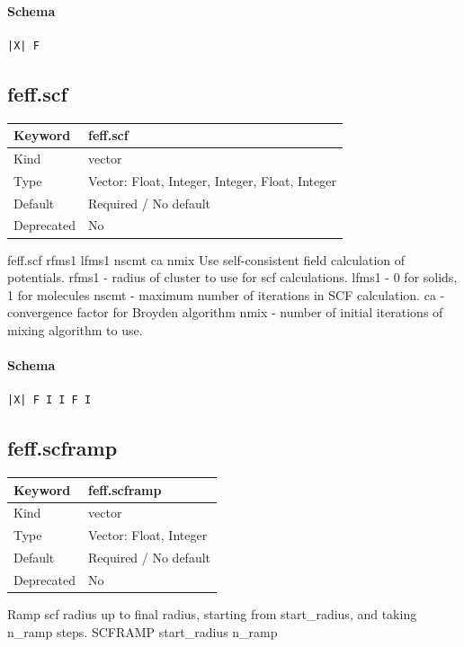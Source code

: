 \documentclass[11pt]{article}
\begin{document}
{{{{\paragraph{Schema}
\begin{Verbatim}
|X| F
\end{Verbatim}

\subsection{feff.scf}
\label{kw:feff-scf}
\begin{longtable}{|p{1.5in}|p{4.5in}|}
\hline
Keyword & feff.scf \\
\hline
Kind & vector \\
\hline
Type & Vector: Float, Integer, Integer, Float, Integer \\
\hline
Default & Required / No default \\
\hline
Deprecated & No \\
\hline
\end{longtable}
 feff.scf{ rfms1 lfms1 nscmt ca nmix }
 Use self-consistent field calculation of potentials.
   rfms1 - radius of cluster to use for scf calculations.
   lfms1 - 0 for solids, 1 for molecules
   nscmt - maximum number of iterations in SCF calculation.
   ca    - convergence factor for Broyden algorithm
   nmix  - number of initial iterations of mixing algorithm to use.

\paragraph{Schema}
\begin{Verbatim}
|X| F I I F I
\end{Verbatim}

\subsection{feff.scframp}
\label{kw:feff-scframp}
\begin{longtable}{|p{1.5in}|p{4.5in}|}
\hline
Keyword & feff.scframp \\
\hline
Kind & vector \\
\hline
Type & Vector: Float, Integer \\
\hline
Default & Required / No default \\
\hline
Deprecated & No \\
\hline
\end{longtable}
 Ramp scf radius up to final radius, starting from start\_radius,
 and taking n\_ramp steps.
 SCFRAMP start\_radius n\_ramp

}}}}
\end{document}
